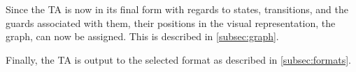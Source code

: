 Since the TA is now in its final form with regards to states, transitions, and the guards associated with them, their positions in the visual representation, the graph, can now be assigned. This is described in \cref{subsec:graph}.

Finally, the TA is output to the selected format as described in \cref{subsec:formats}.












